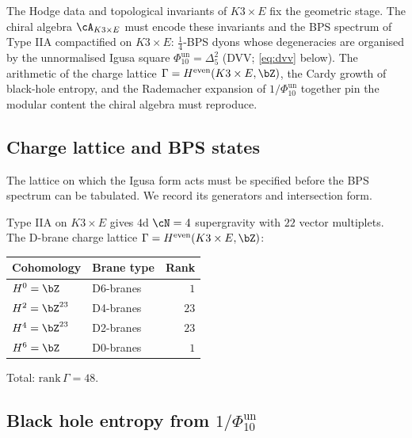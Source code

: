 The Hodge data and topological invariants of $K3 \times E$ fix
the geometric stage. The chiral algebra $\cA_{K3 \times E}$ must
encode these invariants and the BPS spectrum of Type IIA
compactified on $K3 \times E$: $\frac14$-BPS dyons whose
degeneracies are organised by the unnormalised Igusa square
\(\Phi_{10}^{\mathrm{un}}=\Delta_5^2\)
\textup{(}DVV; \eqref{eq:dvv} below\textup{)}. The arithmetic of
the charge lattice $\Gamma = H^{\mathrm{even}}(K3 \times E, \bZ)$,
the Cardy growth of black-hole entropy, and the Rademacher
expansion of \(1/\Phi_{10}^{\mathrm{un}}\) together pin the modular content the
chiral algebra must reproduce.

\subsection{Charge lattice and BPS states}
\label{subsec:charge-lattice}

The lattice on which the Igusa form acts must be specified
before the BPS spectrum can be tabulated. We record its
generators and intersection form.

\begin{proposition}
\label{prop:charge-lattice}
Type IIA on $K3 \times E$ gives $4$d $\cN = 4$ supergravity
with $22$ vector multiplets. The D-brane charge lattice
$\Gamma = H^{\mathrm{even}}(K3 \times E, \bZ)$:
\begin{center}
\small
\renewcommand{\arraystretch}{1.2}
\begin{tabular}{llr}
\textbf{Cohomology} & \textbf{Brane type} & \textbf{Rank} \\
\hline
$H^0 = \bZ$ & D6-branes & $1$ \\
$H^2 = \bZ^{23}$ & D4-branes & $23$ \\
$H^4 = \bZ^{23}$ & D2-branes & $23$ \\
$H^6 = \bZ$ & D0-branes & $1$
\end{tabular}
\end{center}
Total: $\mathrm{rank}\,\Gamma = 48$.
\end{proposition}

\subsection{Black hole entropy from \texorpdfstring{$1/\Phi_{10}^{\mathrm{un}}$}{1/Phi-10-un}}
\label{subsec:bh-entropy}

